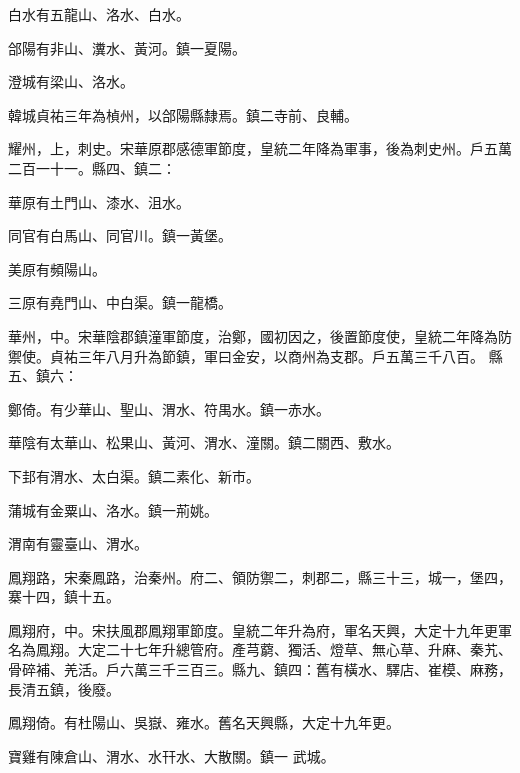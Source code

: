 \begin{pinyinscope}
 白水有五龍山、洛水、白水。



 郃陽有非山、瀵水、黃河。鎮一夏陽。



 澄城有梁山、洛水。



 韓城貞祐三年為楨州，以郃陽縣隸焉。鎮二寺前、良輔。



 耀州，上，刺史。宋華原郡感德軍節度，皇統二年降為軍事，後為刺史州。戶五萬二百一十一。縣四、鎮二：



 華原有土門山、漆水、沮水。



 同官有白馬山、同官川。鎮一黃堡。



 美原有頻陽山。



 三原有堯門山、中白渠。鎮一龍橋。



 華州，中。宋華陰郡鎮潼軍節度，治鄭，國初因之，後置節度使，皇統二年降為防禦使。貞祐三年八月升為節鎮，軍曰金安，以商州為支郡。戶五萬三千八百。
 縣五、鎮六：



 鄭倚。有少華山、聖山、渭水、符禺水。鎮一赤水。



 華陰有太華山、松果山、黃河、渭水、潼關。鎮二關西、敷水。



 下邽有渭水、太白渠。鎮二素化、新市。



 蒲城有金粟山、洛水。鎮一荊姚。



 渭南有靈臺山、渭水。



 鳳翔路，宋秦鳳路，治秦州。府二、領防禦二，刺郡二，縣三十三，城一，堡四，寨十四，鎮十五。



 鳳翔府，中。宋扶風郡鳳翔軍節度。皇統二年升為府，軍名天興，大定十九年更軍名為鳳翔。大定二十七年升總管府。產芎藭、獨活、燈草、無心草、升麻、秦艽、骨碎補、羌活。戶六萬三千三百三。縣九、鎮四：舊有橫水、驛店、崔模、麻務，長清五鎮，後廢。



 鳳翔倚。有杜陽山、吳嶽、雍水。舊名天興縣，大定十九年更。



 寶雞有陳倉山、渭水、水幵水、大散關。鎮一
 武城。




\end{pinyinscope}
